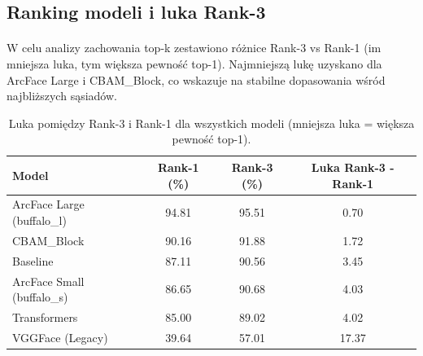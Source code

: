 \subsection{Ranking modeli i luka Rank-3}
\paragraph{}W celu analizy zachowania top-k zestawiono różnice Rank-3 vs Rank-1 (im mniejsza luka, tym większa pewność top-1). Najmniejszą lukę uzyskano dla ArcFace Large i CBAM\_Block, co wskazuje na stabilne dopasowania wśród najbliższych sąsiadów.

\begin{table}[H]
\centering
\small
\begin{tabular}{lccc}
\toprule
\textbf{Model} & \textbf{Rank-1 (\%)} & \textbf{Rank-3 (\%)} & \textbf{Luka Rank-3 - Rank-1} \\
\midrule
ArcFace Large (buffalo\_l) & 94.81 & 95.51 & 0.70 \\
CBAM\_Block & 90.16 & 91.88 & 1.72 \\
Baseline & 87.11 & 90.56 & 3.45 \\
ArcFace Small (buffalo\_s) & 86.65 & 90.68 & 4.03 \\
Transformers & 85.00 & 89.02 & 4.02 \\
VGGFace (Legacy) & 39.64 & 57.01 & 17.37 \\
\bottomrule
\end{tabular}
\caption{Luka pomiędzy Rank-3 i Rank-1 dla wszystkich modeli (mniejsza luka = większa pewność top-1).}
\label{tab:rank_gap}
\end{table}